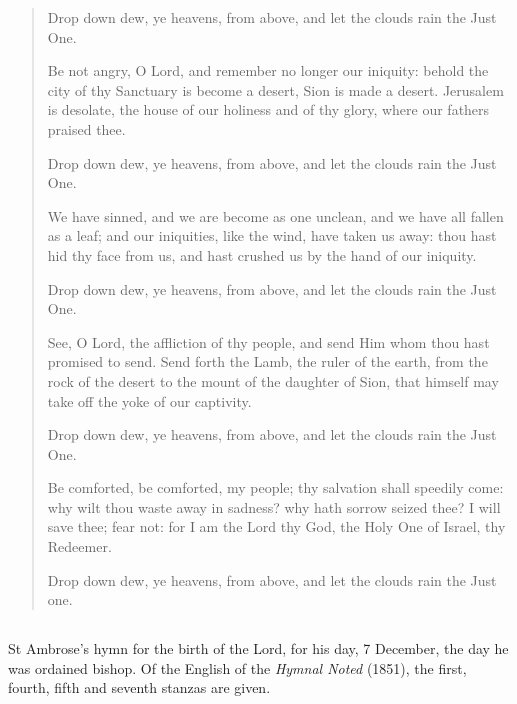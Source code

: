 \begin{quote}
Drop down dew, ye heavens, from above, and let the clouds rain the Just One.\par
Be not angry, O Lord, and remember no longer our iniquity: behold the city of thy Sanctuary is become a desert, Sion is made a desert. Jerusalem is desolate, the house of our holiness and of thy glory, where our fathers praised thee.\par
Drop down dew, ye heavens, from above, and let the clouds rain the Just One.\par
We have sinned, and we are become as one unclean, and we have all fallen as a leaf; and our iniquities, like the wind, have taken us away: thou hast hid thy face from us, and hast crushed us by the hand of our iniquity.\par
Drop down dew, ye heavens, from above, and let the clouds rain the Just One.\par
See, O Lord, the affliction of thy people, and send Him whom thou hast promised to send. Send forth the Lamb, the ruler of the earth, from the rock of the desert to the mount of the daughter of Sion, that himself may take off the yoke of our captivity.\par
Drop down dew, ye heavens, from above, and let the clouds rain the Just One.\par
Be comforted, be comforted, my people; thy salvation shall speedily come: why wilt thou waste away in sadness? why hath sorrow seized thee? I will save thee; fear not: for I am the Lord thy God, the Holy One of Israel, thy Redeemer.\par
Drop down dew, ye heavens, from above, and let the clouds rain the Just one.\par
\end{quote}

\subsection{}

St Ambrose's hymn for the birth of the Lord, for his day, 7 December, the
day he was ordained bishop. Of the English of the \textit{Hymnal Noted}
(1851), the first, fourth, fifth and seventh stanzas are given.

